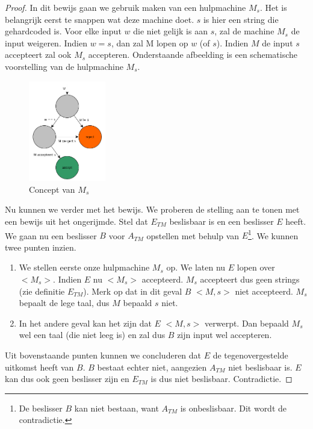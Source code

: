 \begin{proof}
	In dit bewijs gaan we gebruik maken van een hulpmachine $M_s$. Het is belangrijk eerst te snappen wat deze machine doet. $s$ is hier een string die gehardcoded is. Voor elke input $w$ die niet gelijk is aan $s$, zal de machine $M_s$ de input weigeren. Indien $w = s$, dan zal M lopen op $w$ (of $s$). Indien $M$ de input $s$ accepteert zal ook $M_s$ accepteren. Onderstaande afbeelding is een schematische voorstelling van de hulpmachine $M_s$.
	\begin{figure}[H]
  	\centering
    	  \includegraphics[width=0.3\textwidth]{./img/Ms}
  	\caption{Concept van $M_s$}
	\end{figure}
	Nu kunnen we verder met het bewijs. We proberen de stelling aan te tonen met een bewijs uit het ongerijmde. Stel dat $E_{TM}$ beslisbaar is en een beslisser $E$ heeft. We gaan nu een beslisser $B$ voor $A_{TM}$ opstellen met behulp van $E$\footnote{De beslisser $B$ kan niet bestaan, want $A_{TM}$ is onbeslisbaar. Dit wordt de contradictie.}. We kunnen twee punten inzien.
	\begin{enumerate}
		\item We stellen eerste onze hulpmachine $M_s$ op. We laten nu $E$ lopen over $<M_s>$. Indien $E$ nu $<M_s>$ accepteerd. $M_s$ accepteert dus geen strings (zie definitie $E_{TM}$). Merk op dat in dit geval $B$ $<M,s>$ niet accepteerd. $M_s$ bepaalt de lege taal, dus $M$ bepaald $s$ niet.
		\item In het andere geval kan het zijn dat $E$ $<M,s>$ verwerpt. Dan bepaald $M_s$ wel een taal (die niet leeg is) en zal dus $B$ zijn input wel accepteren.
	\end{enumerate}
	Uit bovenstaande punten kunnen we concluderen dat $E$ de tegenovergestelde uitkomst heeft van $B$. $B$ bestaat echter niet, aangezien $A_{TM}$ niet beslisbaar is. $E$ kan dus ook geen beslisser zijn en $E_{TM}$ is dus niet beslisbaar. Contradictie.
\end{proof}

